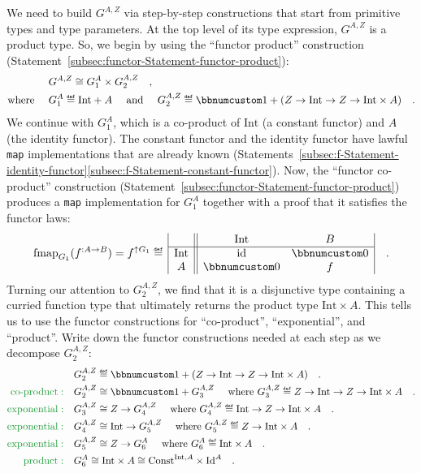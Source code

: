 We need to build $G^{A,Z}$ via step-by-step constructions that start
from primitive types and type parameters. At the top level of its
type expression, $G^{A,Z}$ is a product type. So, we begin by using
the \textsf{``}functor product\textsf{''} construction (Statement~\ref{subsec:functor-Statement-functor-product}):
\begin{align*}
 & G^{A,Z}\cong G_{1}^{A}\times G_{2}^{A,Z}\quad,\\
\text{where }\quad & G_{1}^{A}\triangleq\text{Int}+A\quad\text{ and }\quad G_{2}^{A,Z}\triangleq\bbnum 1+(Z\rightarrow\text{Int}\rightarrow Z\rightarrow\text{Int}\times A)\quad.
\end{align*}
We continue with $G_{1}^{A}$, which is a co-product of $\text{Int}$
(a constant functor) and $A$ (the identity functor). The constant
functor and the identity functor have lawful \lstinline!map! implementations
that are already known (Statements~\ref{subsec:f-Statement-identity-functor}\textendash \ref{subsec:f-Statement-constant-functor}).
Now, the \textsf{``}functor co-product\textsf{''} construction (Statement~\ref{subsec:functor-Statement-functor-product})
produces a \lstinline!map! implementation for $G_{1}^{A}$ together
with a proof that it satisfies the functor laws:
\[
\text{fmap}_{G_{1}}(f^{:A\rightarrow B})=f^{\uparrow G_{1}}\triangleq\,\begin{array}{|c||cc|}
 & \text{Int} & B\\
\hline \text{Int} & \text{id} & \bbnum 0\\
A & \bbnum 0 & f
\end{array}\quad.
\]
Turning our attention to $G_{2}^{A,Z}$, we find that it is a disjunctive
type containing a curried function type that ultimately returns the
product type $\text{Int}\times A$. This tells us to use the functor
constructions for \textsf{``}co-product\textsf{''}, \textsf{``}exponential\textsf{''}, and \textsf{``}product\textsf{''}.
Write down the functor constructions needed at each step as we decompose
$G_{2}^{A,Z}$:
\begin{align*}
 & G_{2}^{A,Z}\triangleq\bbnum 1+(Z\rightarrow\text{Int}\rightarrow Z\rightarrow\text{Int}\times A)\quad.\\
{\color{greenunder}\text{co-product}:}\quad & G_{2}^{A,Z}\cong\bbnum 1+G_{3}^{A,Z}\quad\text{ where }G_{3}^{A,Z}\triangleq Z\rightarrow\text{Int}\rightarrow Z\rightarrow\text{Int}\times A\quad.\\
{\color{greenunder}\text{exponential}:}\quad & G_{3}^{A,Z}\cong Z\rightarrow G_{4}^{A,Z}\quad\text{ where }G_{4}^{A,Z}\triangleq\text{Int}\rightarrow Z\rightarrow\text{Int}\times A\quad.\\
{\color{greenunder}\text{exponential}:}\quad & G_{4}^{A,Z}\cong\text{Int}\rightarrow G_{5}^{A,Z}\quad\text{ where }G_{5}^{A,Z}\triangleq Z\rightarrow\text{Int}\times A\quad.\\
{\color{greenunder}\text{exponential}:}\quad & G_{5}^{A,Z}\cong Z\rightarrow G_{6}^{A}\quad\text{ where }G_{6}^{A}\triangleq\text{Int}\times A\quad.\\
{\color{greenunder}\text{product}:}\quad & G_{6}^{A}\cong\text{Int}\times A\cong\text{Const}^{\text{Int},A}\times\text{Id}^{A}\quad.
\end{align*}
